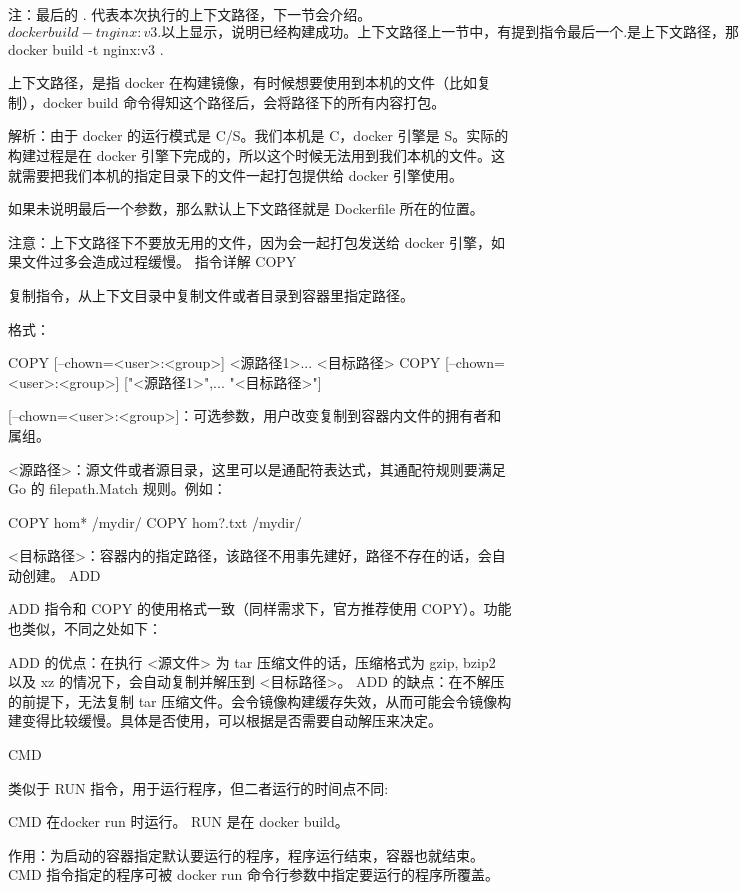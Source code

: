 注：最后的 . 代表本次执行的上下文路径，下一节会介绍。
$ docker build -t nginx:v3 .

以上显示，说明已经构建成功。
上下文路径

上一节中，有提到指令最后一个 . 是上下文路径，那么什么是上下文路径呢？
$ docker build -t nginx:v3 .

上下文路径，是指 docker 在构建镜像，有时候想要使用到本机的文件（比如复制），docker build 命令得知这个路径后，会将路径下的所有内容打包。

解析：由于 docker 的运行模式是 C/S。我们本机是 C，docker 引擎是 S。实际的构建过程是在 docker 引擎下完成的，所以这个时候无法用到我们本机的文件。这就需要把我们本机的指定目录下的文件一起打包提供给 docker 引擎使用。

如果未说明最后一个参数，那么默认上下文路径就是 Dockerfile 所在的位置。

注意：上下文路径下不要放无用的文件，因为会一起打包发送给 docker 引擎，如果文件过多会造成过程缓慢。
指令详解
COPY

复制指令，从上下文目录中复制文件或者目录到容器里指定路径。

格式：

COPY [--chown=<user>:<group>] <源路径1>...  <目标路径>
COPY [--chown=<user>:<group>] ["<源路径1>",...  "<目标路径>"]

[--chown=<user>:<group>]：可选参数，用户改变复制到容器内文件的拥有者和属组。

<源路径>：源文件或者源目录，这里可以是通配符表达式，其通配符规则要满足 Go 的 filepath.Match 规则。例如：

COPY hom* /mydir/
COPY hom?.txt /mydir/

<目标路径>：容器内的指定路径，该路径不用事先建好，路径不存在的话，会自动创建。
ADD

ADD 指令和 COPY 的使用格式一致（同样需求下，官方推荐使用 COPY）。功能也类似，不同之处如下：

    ADD 的优点：在执行 <源文件> 为 tar 压缩文件的话，压缩格式为 gzip, bzip2 以及 xz 的情况下，会自动复制并解压到 <目标路径>。
    ADD 的缺点：在不解压的前提下，无法复制 tar 压缩文件。会令镜像构建缓存失效，从而可能会令镜像构建变得比较缓慢。具体是否使用，可以根据是否需要自动解压来决定。

CMD

类似于 RUN 指令，用于运行程序，但二者运行的时间点不同:

    CMD 在docker run 时运行。
    RUN 是在 docker build。

作用：为启动的容器指定默认要运行的程序，程序运行结束，容器也就结束。CMD 指令指定的程序可被 docker run 命令行参数中指定要运行的程序所覆盖。

